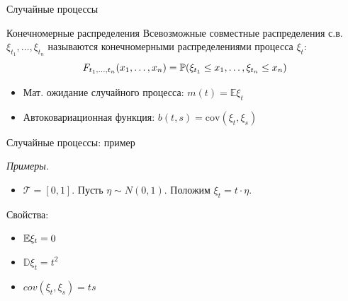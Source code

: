 \documentclass{beamer}
\begin{document}
\begin{frame}{Случайные процессы}
    \begin{block}{Конечномерные распределения}
    Всевозможные совместные распределения с.в. $\xi_{t_1}, \ldots, \xi_{t_n}$ называются конечномерными распределениями процесса $\xi_t$:
    $$
        F_{t_1, \ldots, t_n} (x_1, \ldots, x_n) = \mathbb{P}(\xi_{t_1} \leq x_1, \ldots, \xi_{t_n} \leq x_n)
    $$
\end{block}
\begin{itemize}
    \item Мат. ожидание случайного процесса: $m(t)=\mathbb{E} \xi_t$
    \item Автоковариационная функция: $b(t, s) = \mathrm{cov}(\xi_t, \xi_s)$
\end{itemize}
\end{frame}

\begin{frame}{Случайные процессы: пример}
    
    \textit{Примеры.}
    \begin{itemize}
        \item $\mathcal{T}=[0,1]$. Пусть $\eta \sim N(0,1)$. Положим $\xi_t = t \cdot \eta$.
    \end{itemize}
    Свойства:
    \begin{itemize}
        \item $\mathbb{E} \xi_t = 0$
        \item $\mathbb{D} \xi_t = t^2$
        \item $cov(\xi_t, \xi_s) = ts$
    \end{itemize}
    

    \noindent{}

\end{frame}
\end{document}
